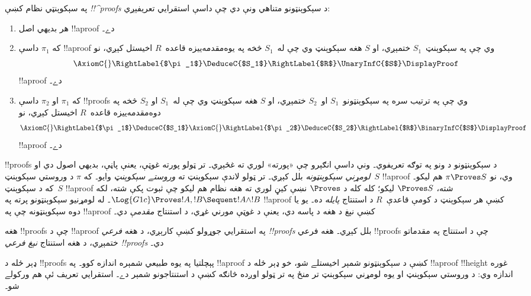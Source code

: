 \documentclass[../../../include/open-logic-section]{subfiles}
\begin{document}
\begin{defn}
په سېکوېنټي نظام کښې \emph{!!^{proof}s} د سېکوېنټونو متناهي ونې دي چې داسې استقرايي تعريفېږي:
\begin{enumerate}
  \item{} هر بديهي اصل !!a{proof} دے۔
  \item{} که $\pi_1$ داسې !!a{proof} وي چې په سېکوېنټ~$S_1$ ختمېږي، او $S$ هغه سېکوېنټ وي چې له~$S_1$ څخه په يوه‌مقدمه‌ييزه قاعده~$R$ اخيستل کېږي، نو
  \[
  \AxiomC{}
  \RightLabel{$\pi_1$}
  \DeduceC{$S_1$}
  \RightLabel{$R$}
  \UnaryInfC{$S$}
  \DisplayProof
  \]
  !!a{proof} دے۔
  \item{} که $\pi_1$ او $\pi_2$ داسې !!{proof}s وي چې په ترتيب سره په سېکوېنټونو~$S_1$ او~$S_2$ ختمېږي، او $S$ هغه سېکوېنټ وي چې له~$S_1$ او $S_2$ څخه په دوه‌مقدمه‌ييزه قاعده~$R$ اخيستل کېږي، نو
  \[
  \AxiomC{}
  \RightLabel{$\pi_1$}
  \DeduceC{$S_1$}
  \AxiomC{}
  \RightLabel{$\pi_2$}
  \DeduceC{$S_2$}
  \RightLabel{$R$}
  \BinaryInfC{$S$}
  \DisplayProof
  \]
  !!a{proof} دے۔
\end{enumerate}
\end{defn}

 !!{proof}s د سېکوېنټونو د ونو په توګه تعريفوي۔ ونې داسې انګېرو چې «پورته» لوري ته غځېږي۔ تر ټولو پورته غوټې، يعنې پاڼې، بديهي اصول دي او \emph{لومړني سېکوېنټونه} بلل کېږي۔ تر ټولو لاندې سېکوېنټ ته \emph{وروستے سېکوېنټ} وايو۔ که $\pi$ د وروستي سېکوېنټ~$S$ !!a{proof} وي، نو $\pi \Proves S$ هم ليکو۔ که د سېکوېنټ~$S$ !!a{proof} شته، $\Proves S$ ليکو؛ کله کله د $\Proves$ نښې کيڼ لوري ته هغه نظام هم ليکو چې ثبوت پکې شته، لکه $\Log{G1c} \Proves !A, !B \Sequent !A \land
!B$۔ له لومړنيو سېکوېنټونو پرته په !!a{proof} کښې هر سېکوېنټ د کومې قاعدې~$R$ د استنتاج \emph{پايله} ده۔ يو يا دوه سېکوېنټونه چې په !!a{proof} کښې نېغ د هغه د پاسه دي، يعنې د غوټې مورني غړي، د استنتاج \emph{مقدمې} دي۔

هغه !!{proof}s چې د !!a{proof} په استقرايي جوړولو کښې کارېږي، د هغه \emph{فرعي !!{proof}s} بلل کېږي۔ هغه فرعي !!{proof}s چې د استنتاج په مقدماتو ختمېږي، د هغه استنتاج \emph{نېغ فرعي !!{proof}s} دي۔

ډېر ځله د !!{proof}s پېچلتيا په يوه طبيعي شمېره اندازه کوو۔ په !!a{proof} کښې د سېکوېنټونو شمېر اخيستلے شو، خو ډېر ځله د !!a{proof} !!{height} غوره اندازه وي: د وروستي سېکوېنټ او يوه لومړني سېکوېنټ تر منځ په تر ټولو اوږده څانګه کښې د استنتاجونو شمېر دے۔ استقرايي تعريف ئې هم ورکولے شو۔
\end{document}
